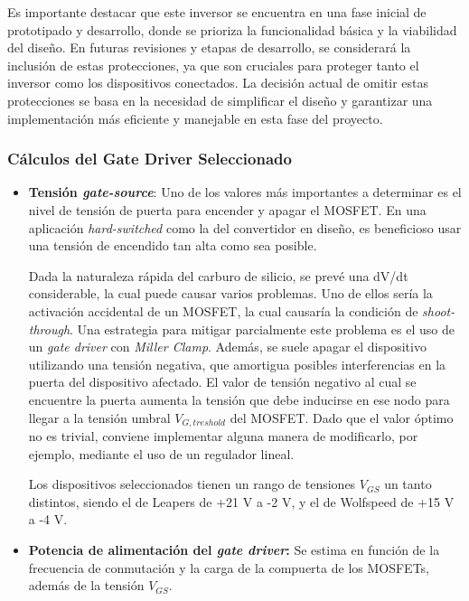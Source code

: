 Es importante destacar que este inversor se encuentra en una fase inicial de prototipado y desarrollo, donde se prioriza la funcionalidad básica y la viabilidad del diseño. En futuras revisiones y etapas de desarrollo, se considerará la inclusión de estas protecciones, ya que son cruciales para proteger tanto el inversor como los dispositivos conectados. La decisión actual de omitir estas protecciones se basa en la necesidad de simplificar el diseño y garantizar una implementación más eficiente y manejable en esta fase del proyecto.

\subsubsection{Cálculos del Gate Driver Seleccionado}


\begin{itemize}
	
	\item \textbf{Tensión \textit{gate-source}}: Uno de los valores más importantes a determinar es el nivel de tensión de puerta para encender y apagar el MOSFET. En una aplicación \textit{hard-switched} como la del convertidor en diseño, es beneficioso usar una tensión de encendido tan alta como sea posible.
	
	Dada la naturaleza rápida del carburo de silicio, se prevé una dV/dt considerable, la cual puede causar varios problemas. Uno de ellos sería la activación accidental de un MOSFET, la cual causaría la condición de \textit{shoot-through}. Una estrategia para mitigar parcialmente este problema es el uso de un \textit{gate driver} con \textit{Miller Clamp}. Además, se suele apagar el dispositivo utilizando una tensión negativa, que amortigua posibles interferencias en la puerta del dispositivo afectado. El valor de tensión negativo al cual se encuentre la puerta aumenta la tensión que debe inducirse en ese nodo para llegar a la tensión umbral $V_{G,treshold}$ del MOSFET. Dado que el valor óptimo no es trivial, conviene implementar alguna manera de modificarlo, por ejemplo, mediante el uso de un regulador lineal.
	
	Los dispositivos seleccionados tienen un rango de tensiones $V_{GS}$ un tanto distintos, siendo el de Leapers de +21 V a -2 V, y el de Wolfspeed de +15 V a -4 V.
	
	\item \textbf{Potencia de alimentación del \textit{gate driver}:} Se estima en función de la frecuencia de conmutación y la carga de la compuerta de los MOSFETs, además de la tensión $V_{GS}$.
	

\end{itemize}

